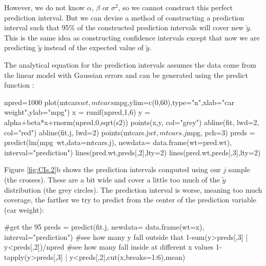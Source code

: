 However, we do not know $\alpha$, $\beta$ or $\sigma^2$, so we cannot construct this perfect prediction interval.  But we can devise a method of constructing a prediction interval such that 95\% of the constructed prediction intervals will cover new $\tilde{y}$.  This is the same idea as constructing confidence intervals except that now we are predicting $\tilde{y}$ instead of the expected value of $\tilde{y}$.

The analytical equation for the prediction intervals assumes the data come from the linear model with Gaussian errors and can be generated using the predict function \verb@predict@:
\begin{Schunk}
\begin{Sinput}
 npred=1000
 plot(mtcars$wt,mtcars$mpg,ylim=c(0,60),type="n",xlab="car weight",ylab="mpg")
 x = runif(npred,1,6)
 y = alpha+beta*x+rnorm(npred,0,sqrt(s2))
 points(x,y, col="grey")
 abline(fit, lwd=2, col="red")
 abline(fit.j, lwd=2)
 points(mtcars.j$wt, mtcars.j$mpg, pch=3)
 preds = predict(lm(mpg~wt,data=mtcars.j), newdata= data.frame(wt=pred.wt), interval="prediction")
 lines(pred.wt,preds[,2],lty=2)
 lines(pred.wt,preds[,3],lty=2)
\end{Sinput}
\end{Schunk}
Figure \ref{fig:CIs.2}b shows the prediction intervals computed using our $j$ sample (the crosses).  These are a bit wide and cover a little too much of the $\tilde{y}$ distribution (the grey circles).  The prediction interval is worse, meaning too much coverage, the farther we try to predict from the center of the prediction variable (car weight):
\begin{Schunk}
\begin{Sinput}
 #get the 95% pred intervals for each x
 preds = predict(fit.j, newdata= data.frame(wt=x), interval="prediction")
 #see how many y fall outside that
 1-sum(y>preds[,3] | y<preds[,2])/npred
 #see how many fall inside at different x values
 1-tapply(y>preds[,3] | y<preds[,2],cut(x,breaks=1:6),mean)
\end{Sinput}
\end{Schunk}

